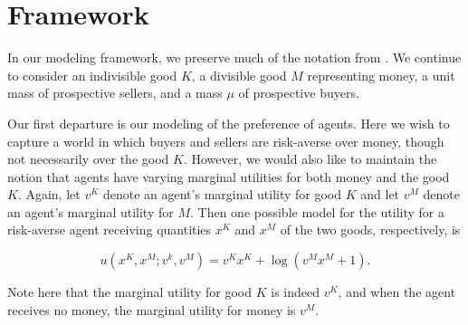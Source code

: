 \documentclass[JEL]{AEA}
\begin{document}
\section{Framework}

In our modeling framework, we preserve much of the notation from \cite{dworczak-2020}. We continue to consider an indivisible good $K$, a divisible good $M$ representing money, a unit mass of prospective sellers, and a mass $\mu$ of prospective buyers.

Our first departure is our modeling of the preference of agents. Here we wish to capture a world in which buyers and sellers are risk-averse over money, though not necessarily over the good $K$. However, we would also like to maintain the notion that agents have varying marginal utilities for both money and the good $K$. Again, let $v^K$ denote an agent's marginal utility for good $K$ and let $v^M$ denote an agent's marginal utility for $M$. Then one possible model for the utility for a risk-averse agent receiving quantities $x^K$ and $x^M$ of the two goods, respectively, is 

$$
u(x^K, x^M; v^k, v^M) = v^K x^K + \log(v^M x^M + 1).
$$

Note here that the marginal utility for good $K$ is indeed $v^K$, and when the agent receives no money, the marginal utility for money is $v^M$.


            
        
    

\end{document}
